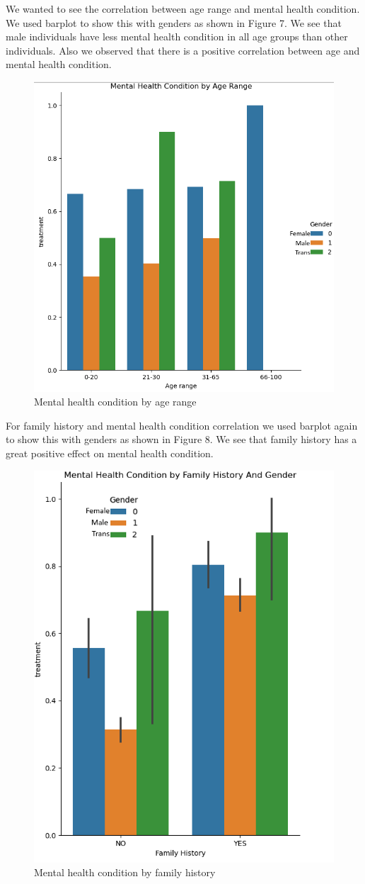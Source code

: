 \documentclass[onecolumn]{article}
\begin{document}
We wanted to see the correlation between age range and mental health condition. We used barplot to show this with genders as shown in Figure 7. We see that male individuals have less mental health condition in all age groups than other individuals. Also we observed that there is a positive correlation between age and mental health condition.

\begin{figure}[h]
\centering
    \includegraphics[width=.44\linewidth]{fig/fig8.png}
\caption{\label{figure8}
Mental health condition by age range}
\end{figure}

For family history and mental health condition correlation we used barplot again to show this with genders as shown in Figure 8. We see that family history has a great positive effect on mental health condition.\bigbreak
\begin{figure}[h]
\centering
    \includegraphics[width=.7\linewidth]{fig/fig9.png}
\caption{\label{figure9}
Mental health condition by family history}
\end{figure}
\end{document}
